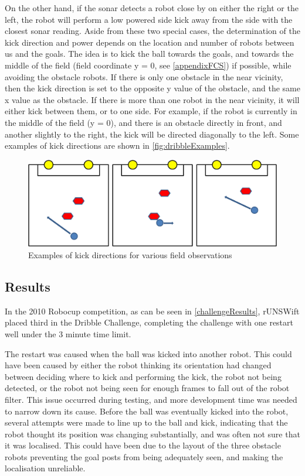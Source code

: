 \documentclass[pdftex,11pt,a4paper]{report}
\begin{document}
On the other hand, if the sonar detects a robot close by on either the right or the left, the robot will perform a low powered side kick away from the side with the closest sonar reading. Aside from these two special cases, the determination of the kick direction and power depends on the location and number of robots between us and the goals. The idea is to kick the ball towards the goals, and towards the middle of the field (field coordinate y = 0, see \autoref{appendixFCS}) if possible, while avoiding the obstacle robots. If there is only one obstacle in the near vicinity, then the kick direction is set to the opposite y value of the obstacle, and the same x value as the obstacle. If there is more than one robot in the near vicinity, it will either kick between them, or to one side. For example, if the robot is currently in the middle of the field (y = 0), and there is an obstacle directly in front, and another slightly to the right, the kick will be directed diagonally to the left. Some examples of kick directions are shown in \autoref{fig:dribbleExamples}.

\begin{figure} [t]
\centering
\includegraphics[width=1.0\textwidth]{figures/dribbleExamples.png}
\caption{Examples of kick directions for various field observations} \label{fig:dribbleExamples}
\end{figure}

\subsection{Results}
In the 2010 Robocup competition, as can be seen in \autoref{challengeResults}, rUNSWift placed third in the Dribble Challenge, completing the challenge with one restart well under the 3 minute time limit.

The restart was caused when the ball was kicked into another robot. This could have been caused by either the robot thinking its orientation had changed between deciding where to kick and performing the kick, the robot not being detected, or the robot not being seen for enough frames to fall out of the robot filter. This issue occurred during testing, and more development time was needed to narrow down its cause. Before the ball was eventually kicked into the robot, several attempts were made to line up to the ball and kick, indicating that the robot thought its position was changing substantially, and was often not sure that it was localised. This could have been due to the layout of the three obstacle robots preventing the goal posts from being adequately seen, and making the localisation unreliable.
\end{document}
